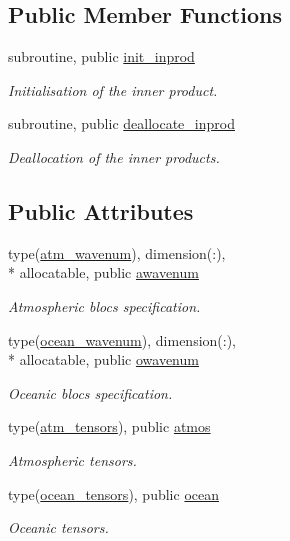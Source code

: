\subsection*{Public Member Functions}
\begin{DoxyCompactItemize}
\item 
subroutine, public \hyperlink{classinprod__analytic_a7491dd2b8ba26eb10d160eb0bf072e56}{init\-\_\-inprod}
\begin{DoxyCompactList}\small\item\em Initialisation of the inner product. \end{DoxyCompactList}\item 
subroutine, public \hyperlink{classinprod__analytic_a77718deee55b484b0946e6c8faf72cd6}{deallocate\-\_\-inprod}
\begin{DoxyCompactList}\small\item\em Deallocation of the inner products. \end{DoxyCompactList}\end{DoxyCompactItemize}
\subsection*{Public Attributes}
\begin{DoxyCompactItemize}
\item 
type(\hyperlink{structinprod__analytic_1_1atm__wavenum}{atm\-\_\-wavenum}), dimension(\-:), \\*
allocatable, public \hyperlink{classinprod__analytic_aa6b6ebedac44495720ffe649bc937a56}{awavenum}
\begin{DoxyCompactList}\small\item\em Atmospheric blocs specification. \end{DoxyCompactList}\item 
type(\hyperlink{structinprod__analytic_1_1ocean__wavenum}{ocean\-\_\-wavenum}), dimension(\-:), \\*
allocatable, public \hyperlink{classinprod__analytic_a7273713c6b1a079e1c653e8b8d2fe089}{owavenum}
\begin{DoxyCompactList}\small\item\em Oceanic blocs specification. \end{DoxyCompactList}\item 
type(\hyperlink{structinprod__analytic_1_1atm__tensors}{atm\-\_\-tensors}), public \hyperlink{classinprod__analytic_a6f4fe9aa292d78b871e5498e411d1297}{atmos}
\begin{DoxyCompactList}\small\item\em Atmospheric tensors. \end{DoxyCompactList}\item 
type(\hyperlink{structinprod__analytic_1_1ocean__tensors}{ocean\-\_\-tensors}), public \hyperlink{classinprod__analytic_ac691a1258fb0a341e2ba5b4811be1c0b}{ocean}
\begin{DoxyCompactList}\small\item\em Oceanic tensors. \end{DoxyCompactList}\end{DoxyCompactItemize}
